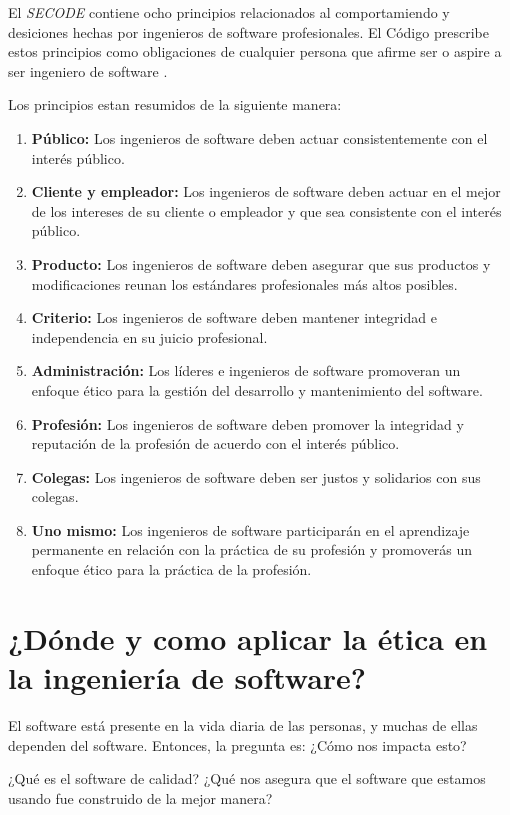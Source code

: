 \documentclass[twoside]{article}
\begin{document}
\begin{multicols}{2}
El \textit{SECODE} contiene ocho principios relacionados al comportamiendo y
desiciones hechas por ingenieros de software profesionales. El Código prescribe
estos principios como obligaciones de cualquier persona que afirme ser o aspire
a ser ingeniero de software \cite{vallor2015introduction}.

Los principios estan resumidos de la siguiente manera:

\begin{enumerate}
\item \textbf{Público:} Los ingenieros de software deben actuar consistentemente
con el interés público.
\item \textbf{Cliente y empleador:} Los ingenieros de software deben actuar en
el mejor de los intereses de su cliente o empleador y que sea consistente con el
interés público.
\item \textbf{Producto:} Los ingenieros de software deben asegurar que sus
productos y modificaciones reunan los estándares profesionales más altos
posibles.
\item \textbf{Criterio:} Los ingenieros de software deben mantener integridad e
independencia en su juicio profesional.
\item \textbf{Administración:} Los líderes e ingenieros de software promoveran
un enfoque ético para la gestión del desarrollo y mantenimiento del software.
\item \textbf{Profesión:} Los ingenieros de software deben promover la
integridad y reputación de la profesión de acuerdo con el interés público.
\item \textbf{Colegas:} Los ingenieros de software deben ser justos y solidarios
con sus colegas.
\item \textbf{Uno mismo:} Los ingenieros de software participarán en el
aprendizaje permanente en relación con la práctica de su profesión y promoverás
un enfoque ético para la práctica de la profesión.
\end{enumerate}

\section{¿Dónde y como aplicar la ética en la ingeniería de software?}

El software está presente en la vida diaria de las personas, y muchas de ellas
dependen del software. Entonces, la pregunta es: ¿Cómo nos impacta esto?

¿Qué es el software de calidad?
¿Qué nos asegura que el software que estamos usando fue construido de la mejor
manera?


\end{multicols}
\end{document}
